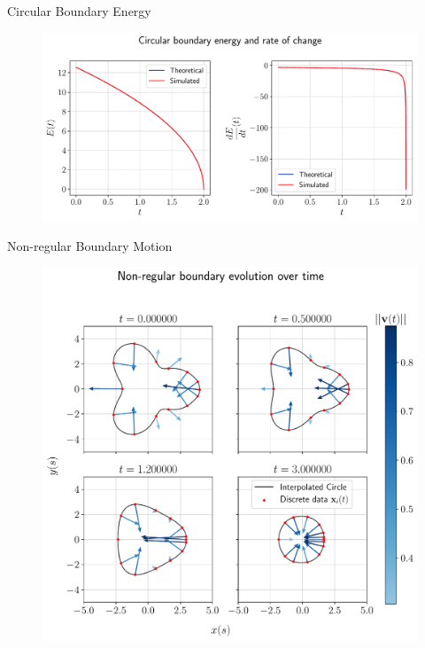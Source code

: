 \documentclass[usenames,dvipsnames]{beamer}
\begin{document}
\begin{frame}{Circular Boundary Energy}
     \begin{figure}
        \centering
        \includegraphics[trim={0 0 0 0}, clip=true, scale=0.43]{figures/closed_boundary/circularboundary_energy.pdf}
    \end{figure}
\end{frame}

\begin{frame}{Non-regular Boundary Motion}
     \begin{figure}
        \centering
        \includegraphics[trim={0 0 0 6em}, clip=true, scale=0.43]{figures/closed_boundary/nonregularboundary.pdf}
    \end{figure}
\end{frame}
\end{document}
